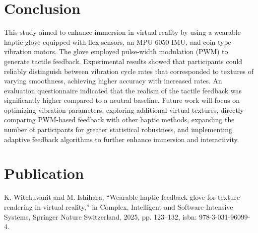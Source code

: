 \documentclass[a4paper,twocolumn]{article}
\begin{document}

\section{Conclusion}
This study aimed to enhance immersion in virtual reality by using a wearable haptic glove equipped with flex sensors, an MPU-6050 IMU, and coin-type vibration motors. The glove employed pulse-width modulation (PWM) to generate tactile feedback. 
Experimental results showed that participants could reliably distinguish between vibration cycle rates that corresponded to textures of varying smoothness, achieving higher accuracy with increased rates. An evaluation questionnaire indicated that the realism of the tactile feedback was significantly higher compared to a neutral baseline.
Future work will focus on optimizing vibration parameters, exploring additional virtual textures, directly comparing PWM-based feedback with other haptic methods, expanding the number of participants for greater statistical robustness, and implementing adaptive feedback algorithms to further enhance immersion and interactivity.


\footnotesize

\section*{Publication}
  \footnotesize
	\begin{enumerate}
		 K. Witchuvanit and M. Ishihara, “Wearable haptic feedback glove for texture rendering in virtual reality,” in Complex, Intelligent and Software Intensive Systems, Springer Nature Switzerland, 2025, pp. 123–132, isbn: 978-3-031-96099-4.
	\end{enumerate}
\end{document}
